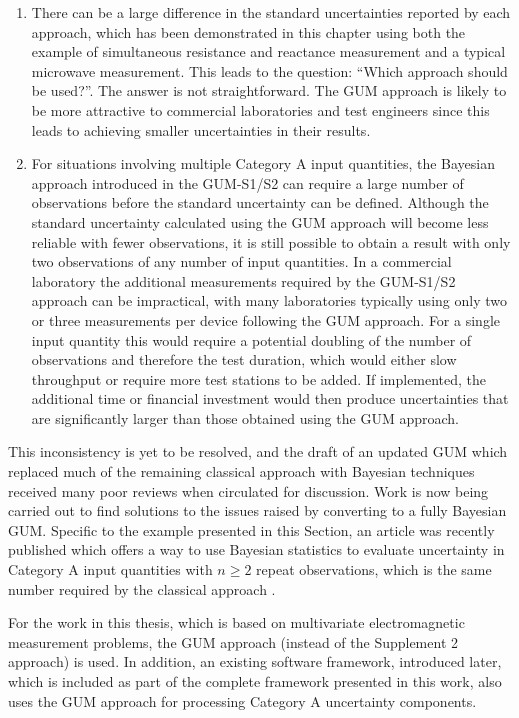 \documentclass[../thesis/thesis.tex]{subfiles}
\begin{document}
\begin{refsection}
\begin{enumerate}
	\item There can be a large difference in the standard uncertainties reported by each approach, which has been demonstrated in this chapter using both the example of simultaneous resistance and reactance measurement and a typical microwave measurement. This leads to the question: ``Which approach should be used?''. The answer is not straightforward. The GUM approach is likely to be more attractive to commercial laboratories and test engineers since this leads to achieving smaller uncertainties in their results.
	\item For situations involving multiple Category A input quantities, the Bayesian approach introduced in the GUM-S1/S2 can require a large number of observations before the standard uncertainty can be defined. Although the standard uncertainty calculated using the GUM approach will become less reliable with fewer observations, it is still possible to obtain a result with only two observations of any number of input quantities. In a commercial laboratory the additional measurements required by the GUM-S1/S2 approach can be impractical, with many laboratories typically using only two or three measurements per device following the GUM approach. For a single input quantity this would require a potential doubling of the number of observations and therefore the test duration, which would either slow throughput or require more test stations to be added. If implemented, the additional time or financial investment would then produce uncertainties that are significantly larger than those obtained using the GUM approach.
\end{enumerate}

This inconsistency is yet to be resolved, and the draft of an updated GUM which replaced much of the remaining classical approach with Bayesian techniques received many poor reviews when circulated for discussion. Work is now being carried out to find solutions to the issues raised by converting to a fully Bayesian GUM. Specific to the example presented in this Section, an article was recently published which offers a way to use Bayesian statistics to evaluate uncertainty in Category A input quantities with $n \ge 2$ repeat observations, which is the same number required by the classical approach \cite{Cox_2017}.

For the work in this thesis, which is based on multivariate electromagnetic measurement problems, the GUM approach (instead of the Supplement 2 approach) is used. In addition, an existing software framework, introduced later, which is included as part of the complete framework presented in this work, also uses the GUM approach for processing Category A uncertainty components.


\end{refsection}
\end{document}

